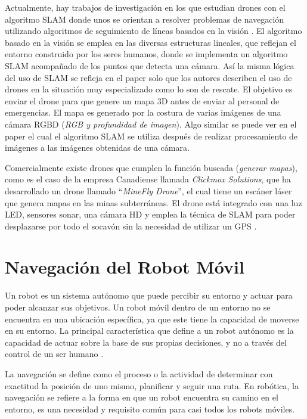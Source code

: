 Actualmente, hay trabajos de investigación en los que estudian drones con el algoritmo SLAM  donde unos se orientan a resolver problemas de navegación utilizando algoritmos de seguimiento de líneas basados en la visión \cite{Verschoor2013}. El algoritmo basado en la visión se emplea en las diversas estructuras lineales, que reflejan el entorno construido por los seres humanos, donde se implementa un algoritmo SLAM acompañado de los puntos que detecta una cámara. Así la misma lógica del uso de SLAM se refleja en el paper \cite{Skoda2015} solo que los autores describen el uso de drones en la situación muy especializado como lo son de rescate. El objetivo es enviar el drone para que genere un mapa 3D antes de enviar al personal de emergencias. El mapa es generado por la costura de varias imágenes de una cámara RGBD (\textit{RGB y profundidad de imagen}). Algo similar se puede ver en el paper \cite{Heukels2015} el cual el algoritmo SLAM se utiliza después de realizar procesamiento de imágenes a las imágenes obtenidas de una cámara.

Comercialmente existe drones que cumplen la función buscada (\textit{generar mapas}), como es el caso de la empresa Canadiense llamada \textit{Clickmox Solutions}, que ha desarrollado un drone llamado “\textit{MineFly Drone}”, el cual tiene un escáner láser que genera mapas en las minas subterráneas. El drone está integrado con una luz LED, sensores sonar, una cámara HD y emplea la técnica de SLAM para poder desplazarse por todo el socavón sin la necesidad de utilizar un GPS \cite{Solutions2016}. 

\section{Navegación del Robot Móvil}

Un robot es un sistema autónomo que puede percibir su entorno y actuar para poder alcanzar sus objetivos. Un robot móvil dentro de un entorno no se encuentra en una ubicación específica, ya que este tiene la capacidad de moverse en su entorno. La principal característica que define a un robot autónomo es la capacidad de actuar sobre la base de sus propias decisiones, y no a través del control de un ser humano \cite{mataric2007robotics}.

La navegación se define como el proceso o la actividad de determinar con exactitud la posición de uno mismo, planificar y seguir una ruta. En robótica, la navegación se refiere a la forma en que un robot encuentra su camino en el entorno, es una necesidad y requisito común para casi todos los robots móviles.

